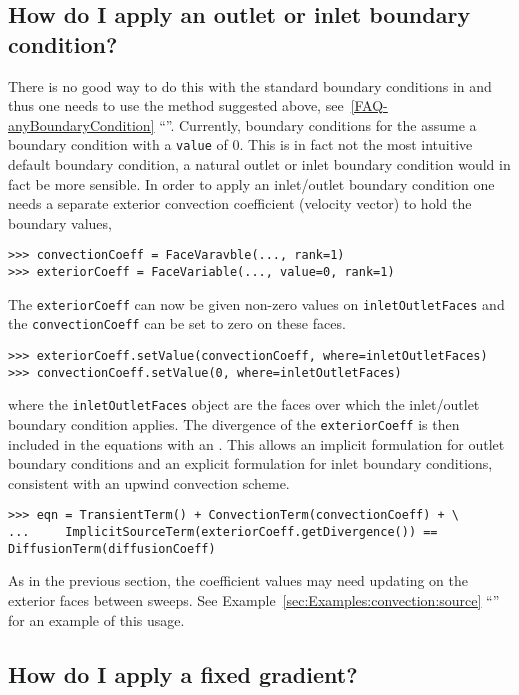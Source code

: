     \subsection{How do I apply an outlet or inlet boundary
      condition?\label{FAQ-inletOutletBoundaryCondition}}

    There is no good way to do this with the standard boundary conditions in
    \FiPy{} and thus one needs to use the method suggested above,
    see~\ref{FAQ-anyBoundaryCondition} ``''.
    Currently, boundary conditions for the  assume a
     boundary condition with a \verb+value+ of 0. This is in
    fact not the most intuitive default boundary condition, a natural outlet or
    inlet boundary condition would in fact be more sensible. In order to apply an
    inlet/outlet boundary condition one needs a separate exterior convection
    coefficient (velocity vector) to hold the boundary values,
\begin{verbatim}
>>> convectionCoeff = FaceVaravble(..., rank=1)
>>> exteriorCoeff = FaceVariable(..., value=0, rank=1)
\end{verbatim}
    The \verb+exteriorCoeff+ can now be given non-zero values on
    \verb+inletOutletFaces+ and the \verb+convectionCoeff+ can be set to zero on
    these faces.
\begin{verbatim}
>>> exteriorCoeff.setValue(convectionCoeff, where=inletOutletFaces)
>>> convectionCoeff.setValue(0, where=inletOutletFaces)
\end{verbatim}
    where the \verb+inletOutletFaces+ object are the faces over which the
    inlet/outlet boundary condition applies. The divergence of the
    \verb+exteriorCoeff+ is then included in the equations with an
    . This allows an implicit formulation for outlet
    boundary conditions and an explicit formulation for inlet boundary
    conditions, consistent with an upwind convection scheme.
\begin{verbatim}
>>> eqn = TransientTerm() + ConvectionTerm(convectionCoeff) + \
...     ImplicitSourceTerm(exteriorCoeff.getDivergence()) == DiffusionTerm(diffusionCoeff)
\end{verbatim}
    As in the previous section, the coefficient values may need updating on the
    exterior faces between sweeps. See
    Example~\ref{sec:Examples:convection:source}
    ``'' for an example of this usage.

    \subsection{How do I apply a fixed gradient?}

